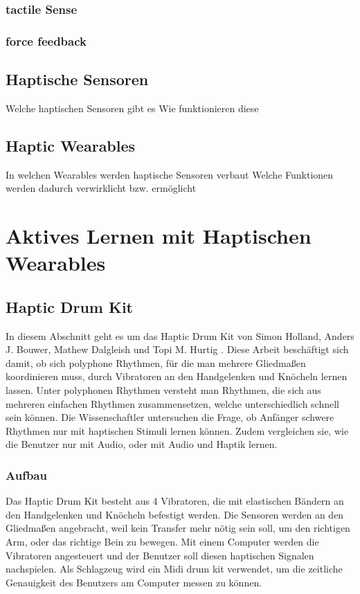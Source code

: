 \documentclass[ngerman,runningheads,a4paper]{llncs}
\begin{document}
\subsubsection{tactile Sense}

\subsubsection{force feedback}

\subsection{Haptische Sensoren}
Welche haptischen Sensoren gibt es
Wie funktionieren diese

\subsection{Haptic Wearables}
In welchen Wearables werden haptische Sensoren verbaut
Welche Funktionen werden dadurch verwirklicht bzw. ermöglicht

\section{Aktives Lernen mit Haptischen Wearables}

\subsection{Haptic Drum Kit}
In diesem Abschnitt geht es um das Haptic Drum Kit von Simon Holland, Anders J. Bouwer, Mathew Dalgleish und Topi M. Hurtig \cite{10.1145/1709886.1709892}
.
Diese Arbeit beschäftigt sich damit, ob sich polyphone Rhythmen, für die man mehrere Gliedmaßen koordinieren muss, durch Vibratoren an den Handgelenken und Knöcheln lernen lassen.
Unter polyphonen Rhythmen versteht man Rhythmen, die sich aus mehreren einfachen Rhythmen zusammensetzen, welche unterschiedlich schnell sein können.
Die Wissenschaftler untersuchen die Frage, ob Anfänger schwere Rhythmen nur mit haptischen Stimuli lernen können.
Zudem vergleichen sie, wie die Benutzer nur mit Audio, oder mit Audio und Haptik lernen.

\subsubsection{Aufbau}
Das Haptic Drum Kit besteht aus 4 Vibratoren, die mit elastischen Bändern an den Handgelenken und Knöcheln befestigt werden.
Die Sensoren werden an den Gliedmaßen angebracht, weil kein Transfer mehr nötig sein soll, um den richtigen Arm, oder das richtige Bein zu bewegen.
Mit einem Computer werden die Vibratoren angesteuert und der Benutzer soll diesen haptischen Signalen nachspielen.
Als Schlagzeug wird ein Midi drum kit verwendet, um die zeitliche Genauigkeit des Benutzers am Computer messen zu können.
\end{document}
